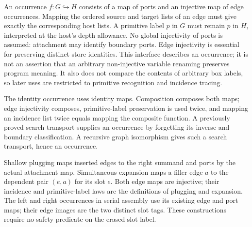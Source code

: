 An occurrence $f:G\hookrightarrow H$ consists of a map of ports and an injective
map of edge occurrences. Mapping the ordered source and target lists of an edge
must give exactly the corresponding host lists. A primitive label $p$ in $G$
must remain $p$ in $H$, interpreted at the host's depth allowance. No global
injectivity of ports is assumed: attachment may identify boundary ports.
Edge injectivity is essential for preserving distinct store identities.
This interface describes an occurrence; it is not an assertion that an arbitrary
non-injective variable renaming preserves program meaning. It also does not
compare the contents of arbitrary box labels, so later uses are restricted to
primitive recognition and incidence tracing.


The identity occurrence uses identity maps. Composition composes both maps;
edge injectivity composes, primitive-label preservation is used twice, and
mapping an incidence list twice equals mapping the composite function.
A previously proved search transport supplies an occurrence by forgetting
its inverse and boundary classification. A recursive graph isomorphism gives
such a search transport, hence an occurrence.





Shallow plugging maps inserted edges to the right summand and ports by the
actual attachment map. Simultaneous expansion maps a filler edge $a$ to the
dependent pair $(e,a)$ for its slot $e$. Both edge maps are injective; their
incidence and primitive-label laws are the definitions of plugging and
expansion. The left and right occurrences in serial assembly use its existing
edge and port maps; their edge images are the two distinct slot tags. These
constructions require no safety predicate on the erased slot label.




